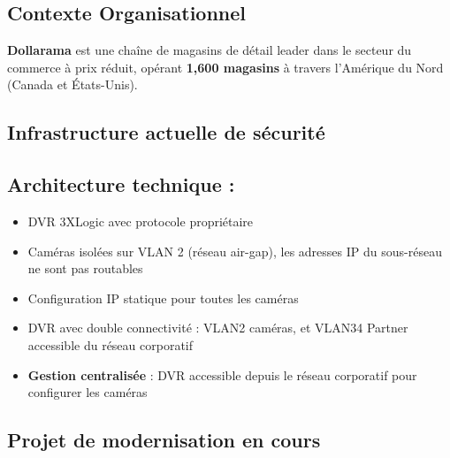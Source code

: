 \documentclass{UTT-Books-44}
\begin{document}

\subsection{Contexte Organisationnel}

\textbf{Dollarama} est une chaîne de magasins de détail leader dans le secteur du commerce à prix réduit, opérant \textbf{1,600 magasins} à travers l'Amérique du Nord (Canada et États-Unis).

\subsection{Infrastructure actuelle de sécurité}


\subsection{Architecture technique :}
\begin{itemize}
\item DVR 3XLogic avec protocole propriétaire
\item Caméras isolées sur VLAN 2 (réseau air-gap), les adresses IP du sous-réseau ne sont pas routables
\item Configuration IP statique pour toutes les caméras
\item DVR avec double connectivité : VLAN2 caméras, et VLAN34 Partner accessible du réseau corporatif
\item \textbf{Gestion centralisée} : DVR accessible depuis le réseau corporatif pour configurer les caméras
\end{itemize}

\subsection{Projet de modernisation en cours}
\end{document}
